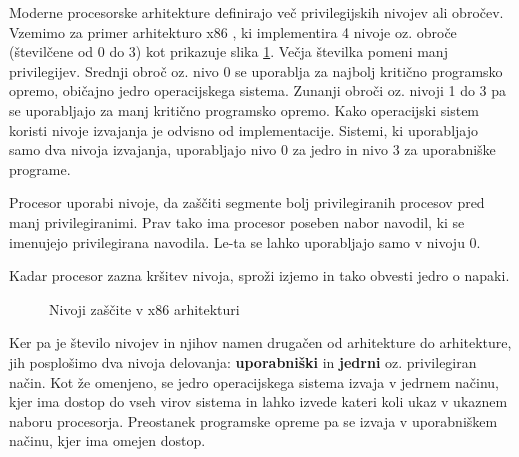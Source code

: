 \documentclass[a4paper,12pt,openright]{book}
\begin{document}
Moderne procesorske arhitekture definirajo več privilegijskih nivojev ali obročev.
Vzemimo za primer arhitekturo x86 \cite{Intel_2024}, ki implementira 4 nivoje oz. obroče (številčene od 0 do 3) kot prikazuje slika \ref{fig:privilege_levels_x86}.
Večja številka pomeni manj privilegijev.
Srednji obroč oz. nivo 0 se uporablja za najbolj kritično programsko opremo, običajno jedro operacijskega sistema.
Zunanji obroči oz. nivoji 1 do 3 pa se uporabljajo za manj kritično programsko opremo.
Kako operacijski sistem koristi nivoje izvajanja je odvisno od implementacije.
Sistemi, ki uporabljajo samo dva nivoja izvajanja, uporabljajo nivo 0 za jedro in nivo 3 za uporabniške programe.

Procesor uporabi nivoje, da zaščiti segmente bolj privilegiranih procesov pred manj privilegiranimi.
Prav tako ima procesor poseben nabor navodil, ki se imenujejo privilegirana navodila.
Le-ta se lahko uporabljajo samo v nivoju 0.

Kadar procesor zazna kršitev nivoja, sproži izjemo in tako obvesti jedro o napaki.

\begin{figure}[h!]
	\begin{center}
	\end{center}
	\caption{Nivoji zaščite v x86 arhitekturi \cite{Intel_2024}}
	\label{fig:privilege_levels_x86}
\end{figure}

Ker pa je število nivojev in njihov namen drugačen od arhitekture do arhitekture, jih posplošimo dva nivoja delovanja: \textbf{uporabniški} in \textbf{jedrni} oz. privilegiran način.
Kot že omenjeno, se jedro operacijskega sistema izvaja v jedrnem načinu, kjer ima dostop do vseh virov sistema in lahko izvede kateri koli ukaz v ukaznem naboru procesorja.
Preostanek programske opreme pa se izvaja v uporabniškem načinu, kjer ima omejen dostop.
\end{document}
